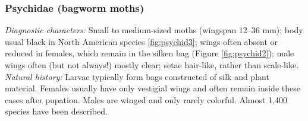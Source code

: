 \documentclass[letterpaper, 11pt]{article}
\begin{document}
\subsubsection{Psychidae (bagworm moths)}
\noindent{}\textit{Diagnostic characters:} Small to medium-sized moths (wingspan 12--36 mm); body usual black in North American species \ref{fig:psychid3}; wings often absent or reduced in females, which remain in the silken bag (Figure \ref{fig:psychid2}); male wings often (but not always!) mostly clear; setae hair-like, rather than scale-like.\\

\noindent{}\textit{Natural history:} Larvae typically form bags constructed of silk and plant material. Females usually have only vestigial wings and often remain inside these cases after pupation. Males are winged and only rarely colorful. Almost 1,400 species have been described.
\end{document}
